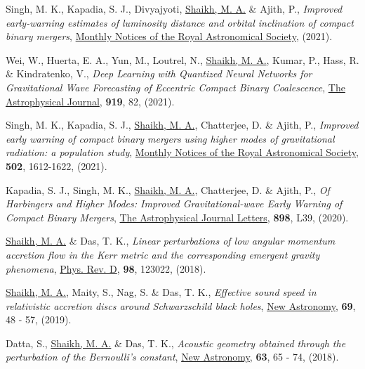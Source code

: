 \begin{etaremune}
\item Singh, M. K., Kapadia, S. J., Divyajyoti, \underline{Shaikh, M. A.} \& Ajith, P., {\itshape {Improved early-warning estimates of luminosity distance and orbital inclination of compact binary mergers}}, \href{https://doi.org/10.1093/mnras/stac852}{{Monthly Notices of the Royal Astronomical Society}}, (2021).
\item Wei, W., Huerta, E. A., Yun, M., Loutrel, N.,  \underline{Shaikh, M. A.}, Kumar, P., Hass, R. \& Kindratenko, V., {\itshape  Deep Learning with Quantized Neural Networks for Gravitational Wave Forecasting of Eccentric Compact Binary Coalescence}, \href{https://iopscience.iop.org/article/10.3847/1538-4357/ac1121}{The Astrophysical Journal}, {\bfseries 919}, 82, (2021).
\item Singh, M. K., Kapadia, S. J., \underline{Shaikh, M. A.}, Chatterjee, D. \& Ajith, P., {\itshape {Improved early warning of compact binary mergers using higher modes of gravitational radiation: a population study}}, \href{https://doi.org/10.1093/mnras/stab125}{{Monthly Notices of the Royal Astronomical Society}}, {\bfseries 502}, 1612-1622, (2021).
\item Kapadia, S. J., Singh, M. K., \underline{Shaikh, M. A.}, Chatterjee, D. \& Ajith, P., {\itshape Of Harbingers and Higher Modes: Improved Gravitational-wave Early Warning of Compact Binary Mergers}, \href{https://doi.org/10.3847%2F2041-8213%2Faba42d}{{The Astrophysical Journal Letters}}, {\bfseries 898}, L39, (2020).
\item \underline{Shaikh, M. A.} \& Das, T. K., {\itshape Linear perturbations of low angular momentum accretion flow in the Kerr metric and the corresponding emergent gravity phenomena}, \href{https://link.aps.org/doi/10.1103/PhysRevD.98.123022}{{Phys. Rev. D}}, {\bfseries 98}, 123022, (2018).
\item \underline{Shaikh, M. A.}, Maity, S., Nag, S. \& Das, T. K., {\itshape Effective sound speed in relativistic accretion discs around Schwarzschild black holes}, \href{http://www.sciencedirect.com/science/article/pii/S1384107618302896}{{New Astronomy}}, {\bfseries 69}, 48 - 57, (2019).
\item Datta, S., \underline{Shaikh, M. A.} \& Das, T. K., {\itshape Acoustic geometry obtained through the perturbation of the Bernoulli’s constant}, \href{http://www.sciencedirect.com/science/article/pii/S1384107617301847}{{New Astronomy}}, {\bfseries 63}, 65 - 74, (2018).

\end{etaremune}
